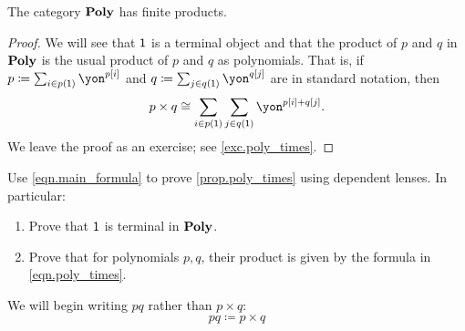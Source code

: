 \documentclass[DynamicalBook]{subfiles}
\begin{document}
\begin{proposition}\label{prop.poly_times}
The category $\textbf{Poly}$ has finite products. 
\end{proposition}
\begin{proof}
We will see that $\textsf{1}$ is a terminal object and that the product of $p$ and $q$ in $\textbf{Poly}$ is the usual product of $p$ and $q$ as polynomials. That is, if $p\coloneqq\sum_{i\in p(\1)}\yon^{p[i]}$ and $q\coloneqq\sum_{j\in q(\1)}\yon^{q[j]}$ are in standard notation, then
\begin{equation}\label{eqn.poly_times}
p\times q\cong\sum_{i\in p(\1)}\sum_{j\in q(\1)}\yon^{p[i]+q[j]}.
\end{equation}
We leave the proof as an exercise; see \cref{exc.poly_times}.
\end{proof}

\begin{exercise}\label{exc.poly_times}
Use \cref{eqn.main_formula} to prove \cref{prop.poly_times} using dependent lenses. In particular:
\begin{enumerate}
	\item Prove that $\textsf{1}$ is terminal in $\textbf{Poly}$.
	\item Prove that for polynomials $p,q$, their product is given by the formula in \eqref{eqn.poly_times}.
\qedhere
\end{enumerate}
\end{exercise}

We will begin writing $pq$ rather than $p\times q$:
\begin{equation} \tag{Notation}
pq\coloneqq p\times q
\end{equation}
\end{document}
